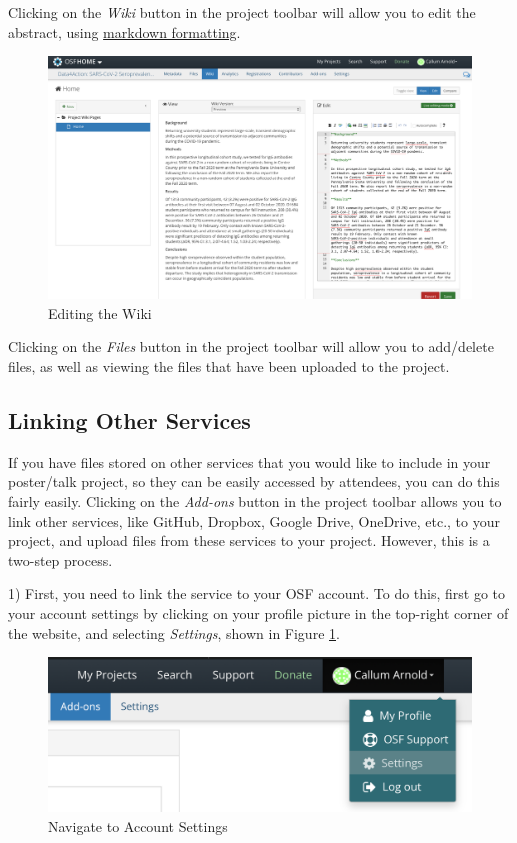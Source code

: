 \documentclass{scrartcl}
\begin{document}
Clicking on the \emph{Wiki} button in the project toolbar will allow you to edit the abstract, using \href{https://www.markdownguide.org/basic-syntax/}{markdown formatting}.

\begin{figure}[h]
    \includegraphics[width=\textwidth]{wiki-edit.png}
    \caption{Editing the Wiki}
\end{figure}

Clicking on the \emph{Files} button in the project toolbar will allow you to add/delete files, as well as viewing the files that have been uploaded to the project.

\subsection{Linking Other Services}

If you have files stored on other services that you would like to include in your poster/talk project, so they can be easily accessed by attendees, you can do this fairly easily.
Clicking on the \emph{Add-ons} button in the project toolbar allows you to link other services, like GitHub, Dropbox, Google Drive, OneDrive, etc., to your project, and upload files from these services to your project.
However, this is a two-step process.

1) First, you need to link the service to your OSF account.
To do this, first go to your account settings by clicking on your profile picture in the top-right corner of the website, and selecting \emph{Settings}, shown in Figure \ref{fig:addons-account-settings-01}.

\begin{figure}[h]
    \centering
    \includegraphics[scale=0.5]{addons-account-settings-01.png}
    \caption{Navigate to Account Settings}
    \label{fig:addons-account-settings-01}
\end{figure}
\end{document}
